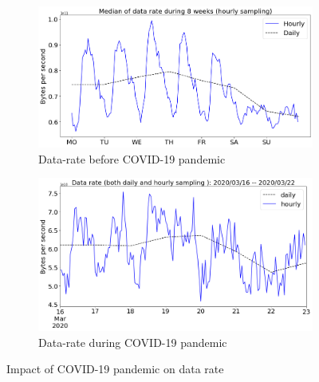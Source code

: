 \documentclass[10pt, journal, letterpaper]{IEEEtran}
\newcommand\figSzeMahdi{0.8}
\begin{document}
\begin{figure}[hbt!]
    \centering
    \begin{subfigure}{\figSzeMahdi\columnwidth}
          \centering
          \includegraphics[width=\columnwidth]{img/BCO_byterate.png}
          \caption{Data-rate before COVID-19 pandemic}
          \label{fig:BCO_bps}
    \end{subfigure}
    \begin{subfigure}{\figSzeMahdi\columnwidth}
          \centering
          \includegraphics[width=\columnwidth]{img/CO2_byterate.png}
          \caption{Data-rate during COVID-19 pandemic}
          \label{fig:CO_bps}
    \end{subfigure}
    \caption{Impact of COVID-19 pandemic on data rate}
    \label{fig:datarate_BCO_CO}
\end{figure}
\end{document}
